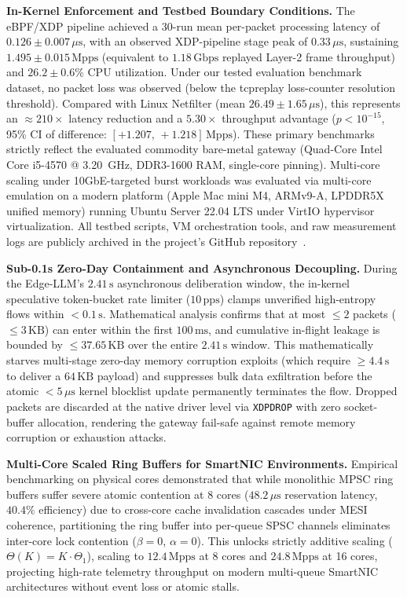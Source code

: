 \documentclass{ieeeaccess}
\renewcommand{\_}{\textunderscore\allowbreak}
\begin{document}
\textbf{In-Kernel Enforcement and Testbed Boundary Conditions.}
The eBPF/XDP pipeline achieved a 30-run mean per-packet processing latency of
$0.126 \pm 0.007\,\mu\text{s}$, with an observed XDP-pipeline stage peak of
$0.33\,\mu\text{s}$, sustaining $1.495 \pm 0.015\,\text{Mpps}$ (equivalent to
$1.18\,\text{Gbps}$ replayed Layer-2 frame throughput) and $26.2 \pm 0.6\%$ CPU utilization.
Under our tested evaluation benchmark dataset, no packet loss was observed (below the
tcpreplay loss-counter resolution threshold). Compared with Linux Netfilter
(mean $26.49 \pm 1.65\,\mu\text{s}$), this represents an $\approx\!210\times$ latency reduction
and a $5.30\times$ throughput advantage ($p < 10^{-15}$, 95\% CI of difference:
$[+1.207,\, +1.218]\,\text{Mpps}$). These primary benchmarks strictly reflect the evaluated
commodity bare-metal gateway (Quad-Core Intel Core i5-4570 @ 3.20~GHz, DDR3-1600 RAM,
single-core pinning). Multi-core scaling under 10GbE-targeted burst workloads was evaluated
via multi-core emulation on a modern platform (Apple Mac mini M4, ARMv9-A, LPDDR5X unified memory)
running Ubuntu Server 22.04 LTS under VirtIO hypervisor virtualization. All testbed scripts,
VM orchestration tools, and raw measurement logs are publicly archived in the project's
GitHub repository~\cite{asmshadhinai2026code}.

\textbf{Sub-0.1s Zero-Day Containment and Asynchronous Decoupling.}
During the Edge-LLM's $2.41\,\text{s}$ asynchronous deliberation window, the in-kernel speculative
token-bucket rate limiter ($10\,\text{pps}$) clamps unverified high-entropy flows within $< 0.1\,\text{s}$.
Mathematical analysis confirms that at most $\le 2$ packets ($\le 3\,\text{KB}$) can enter within
the first $100\,\text{ms}$, and cumulative in-flight leakage is bounded by $\le 37.65\,\text{KB}$ over
the entire $2.41\,\text{s}$ window. This mathematically starves multi-stage zero-day memory corruption
exploits (which require $\ge 4.4\,\text{s}$ to deliver a $64\,\text{KB}$ payload) and suppresses bulk
data exfiltration before the atomic $< 5\,\mu\text{s}$ kernel blocklist update permanently terminates the flow.
Dropped packets are discarded at the native driver level via \texttt{XDP\_DROP} with zero socket-buffer allocation,
rendering the gateway fail-safe against remote memory corruption or exhaustion attacks.

\textbf{Multi-Core Scaled Ring Buffers for SmartNIC Environments.}
Empirical benchmarking on physical cores demonstrated that while monolithic MPSC ring buffers suffer
severe atomic contention at 8 cores ($48.2\,\mu\text{s}$ reservation latency, $40.4\%$ efficiency) due
to cross-core cache invalidation cascades under MESI coherence, partitioning the ring buffer into
per-queue SPSC channels eliminates inter-core lock contention ($\beta = 0$, $\alpha = 0$). This unlocks
strictly additive scaling ($\Theta(K) = K \cdot \Theta_1$), scaling to $12.4\,\text{Mpps}$ at 8 cores
and $24.8\,\text{Mpps}$ at 16 cores, projecting high-rate telemetry throughput on modern multi-queue
SmartNIC architectures without event loss or atomic stalls.
\end{document}
